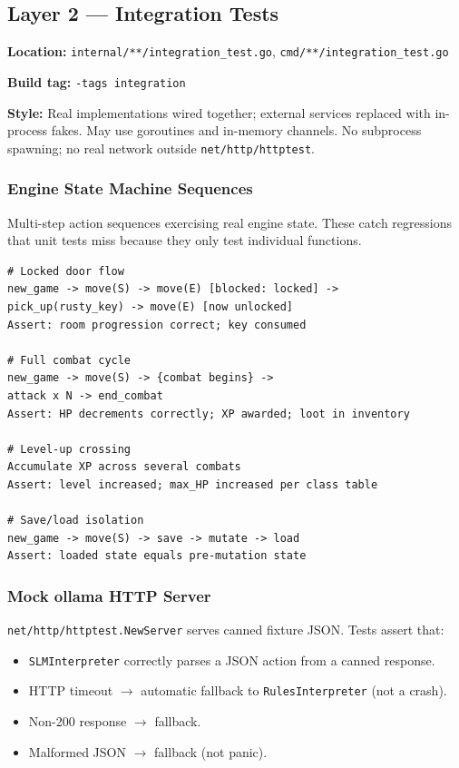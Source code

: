\documentclass[a4paper,10pt]{article}
\begin{document}
\subsection{Layer 2 --- Integration Tests}

\textbf{Location:} \texttt{internal/**/integration\_test.go},
\texttt{cmd/**/integration\_test.go}

\textbf{Build tag:} \texttt{-tags integration}

\textbf{Style:} Real implementations wired together; external
services replaced with in-process fakes.  May use goroutines and
in-memory channels.  No subprocess spawning; no real network outside
\texttt{net/http/httptest}.

\subsubsection{Engine State Machine Sequences}

Multi-step action sequences exercising real engine state.  These
catch regressions that unit tests miss because they only test
individual functions.

\begin{lstlisting}[title={Representative integration sequences}]
# Locked door flow
new_game -> move(S) -> move(E) [blocked: locked] ->
pick_up(rusty_key) -> move(E) [now unlocked]
Assert: room progression correct; key consumed

# Full combat cycle
new_game -> move(S) -> {combat begins} ->
attack x N -> end_combat
Assert: HP decrements correctly; XP awarded; loot in inventory

# Level-up crossing
Accumulate XP across several combats
Assert: level increased; max_HP increased per class table

# Save/load isolation
new_game -> move(S) -> save -> mutate -> load
Assert: loaded state equals pre-mutation state
\end{lstlisting}

\subsubsection{Mock ollama HTTP Server}

\texttt{net/http/httptest.NewServer} serves canned fixture JSON.
Tests assert that:

\begin{itemize}
  \item \texttt{SLMInterpreter} correctly parses a JSON action from
    a canned response.
  \item HTTP timeout $\to$ automatic fallback to
    \texttt{RulesInterpreter} (not a crash).
  \item Non-200 response $\to$ fallback.
  \item Malformed JSON $\to$ fallback (not panic).
\end{itemize}
\end{document}
